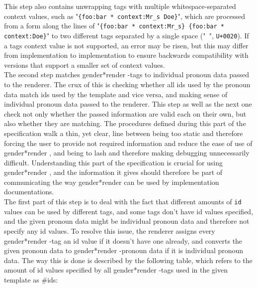 \documentclass{article}
\newcommand{\GenderRender}{
    gender*render
}
\begin{document}
    This step also contains unwrapping tags with multiple whitespace-separated context values, such as "\texttt{\{foo:bar * context:Mr\_s Doe\}}", which are processed from a form along the lines of "\texttt{\{foo:bar * context:Mr\_s\} \{foo:bar * context:Doe\}}" to two different tags separated by a single space ("\texttt{ }", \texttt{U+0020}).
    If a tags context value is not supported, an error may be risen, but this may differ from implementation to implementation to ensure backwards compatibility with versions that support a smaller set of context values.\\

    The second step matches \GenderRender-tags to individual pronoun data passed to the renderer.
    The crux of this is checking whether all ids used by the pronoun data match ids used by the template and vice versa, and making sense of individual pronoun data passed to the renderer.
    This step as well as the next one check not only whether the passed information are valid each on their own, but also whether they are matching.
    The procedures defined during this part of the specification walk a thin, yet clear, line between being too static and therefore forcing the user to provide not required information and reduce the ease of use of \GenderRender, and being to lash and therefore making debugging unnecessarily difficult.
    Understanding this part of the specification is crucial for using \GenderRender, and the information it gives should therefore be part of communicating the way \GenderRender can be used by implementation documentations.\\

    The first part of this step is to deal with the fact that different amounts of \texttt{id} values can be used by different tags, and some tags don't have id values specified, and the given pronoun data might be individual pronoun data and therefore not specify any id values.
    To resolve this issue, the renderer assigns every \GenderRender-tag an id value if it doesn't have one already, and converts the given pronoun data to \GenderRender-pronoun data if it is individual pronoun data.
    The way this is done is described by the following table, which refers to the amount of id values specified by all \GenderRender-tags used in the given template as \#ids:
\end{document}
